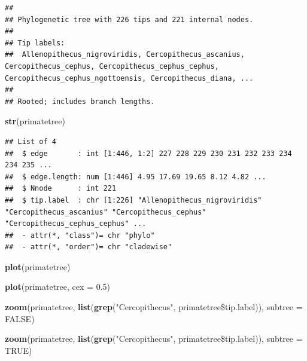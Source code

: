 \documentclass[]{article}
\newenvironment{Shaded}{\begin{snugshade}}{\end{snugshade}}
\newcommand{\KeywordTok}[1]{\textcolor[rgb]{0.13,0.29,0.53}{\textbf{{#1}}}}
\newcommand{\DataTypeTok}[1]{\textcolor[rgb]{0.13,0.29,0.53}{{#1}}}
\newcommand{\FloatTok}[1]{\textcolor[rgb]{0.00,0.00,0.81}{{#1}}}
\newcommand{\StringTok}[1]{\textcolor[rgb]{0.31,0.60,0.02}{{#1}}}
\newcommand{\OtherTok}[1]{\textcolor[rgb]{0.56,0.35,0.01}{{#1}}}
\newcommand{\NormalTok}[1]{{#1}}
\begin{document}
\begin{verbatim}
## 
## Phylogenetic tree with 226 tips and 221 internal nodes.
## 
## Tip labels:
##  Allenopithecus_nigroviridis, Cercopithecus_ascanius, Cercopithecus_cephus, Cercopithecus_cephus_cephus, Cercopithecus_cephus_ngottoensis, Cercopithecus_diana, ...
## 
## Rooted; includes branch lengths.
\end{verbatim}

\begin{Shaded}
\begin{Highlighting}[]
\KeywordTok{str}\NormalTok{(primatetree)}
\end{Highlighting}
\end{Shaded}

\begin{verbatim}
## List of 4
##  $ edge       : int [1:446, 1:2] 227 228 229 230 231 232 233 234 234 235 ...
##  $ edge.length: num [1:446] 4.95 17.69 19.65 8.12 4.82 ...
##  $ Nnode      : int 221
##  $ tip.label  : chr [1:226] "Allenopithecus_nigroviridis" "Cercopithecus_ascanius" "Cercopithecus_cephus" "Cercopithecus_cephus_cephus" ...
##  - attr(*, "class")= chr "phylo"
##  - attr(*, "order")= chr "cladewise"
\end{verbatim}

\begin{Shaded}
\begin{Highlighting}[]
\KeywordTok{plot}\NormalTok{(primatetree)}
\end{Highlighting}
\end{Shaded}

\begin{Shaded}
\begin{Highlighting}[]
\KeywordTok{plot}\NormalTok{(primatetree, }\DataTypeTok{cex =} \FloatTok{0.5}\NormalTok{)}
\end{Highlighting}
\end{Shaded}

\begin{Shaded}
\begin{Highlighting}[]
\KeywordTok{zoom}\NormalTok{(primatetree, }\KeywordTok{list}\NormalTok{(}\KeywordTok{grep}\NormalTok{(}\StringTok{"Cercopithecus"}\NormalTok{, primatetree\$tip.label)), }
\DataTypeTok{subtree =} \OtherTok{FALSE}\NormalTok{)}
\end{Highlighting}
\end{Shaded}

\begin{Shaded}
\begin{Highlighting}[]
\KeywordTok{zoom}\NormalTok{(primatetree, }\KeywordTok{list}\NormalTok{(}\KeywordTok{grep}\NormalTok{(}\StringTok{"Cercopithecus"}\NormalTok{, primatetree\$tip.label)), }\DataTypeTok{subtree =} \OtherTok{TRUE}\NormalTok{)}
\end{Highlighting}
\end{Shaded}
\end{document}
